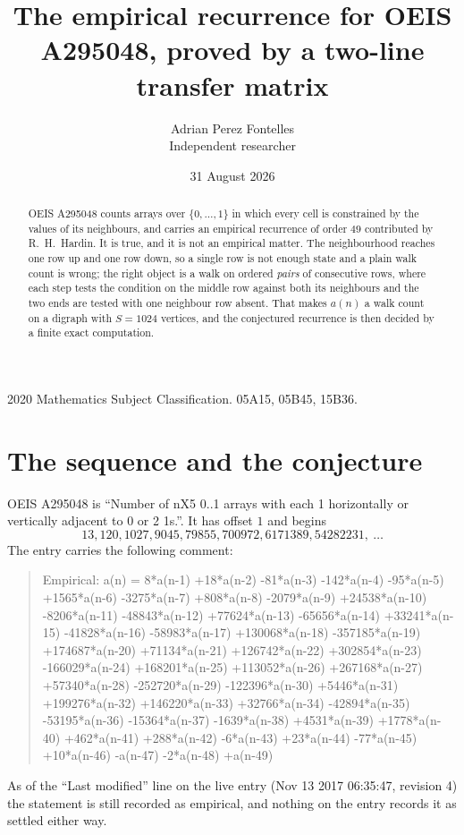 \documentclass[11pt,a4paper]{article}
\title{The empirical recurrence for OEIS A295048, proved by a two-line transfer matrix}
\author{Adrian Perez Fontelles\\ \small Independent researcher}
\date{31 August 2026}
\theoremstyle{plain}
\theoremstyle{definition}
\begin{document}
\maketitle

\begin{abstract}
OEIS A295048 counts arrays over $\{0,\dots,1\}$ in which every cell is constrained by the
values of its neighbours, and carries an empirical recurrence of order $49$ contributed
by R.~H.~Hardin. It is true, and it is not an empirical matter. The neighbourhood reaches one
row up and one row down, so a single row is not enough state and a plain walk count
is wrong; the right object is a walk on ordered \emph{pairs} of consecutive rows, where
each step tests the condition on the middle row against both its neighbours and the two
ends are tested with one neighbour row absent. That makes $a(n)$ a walk count on a digraph
with $S=1024$ vertices, and the conjectured recurrence is then decided by a finite exact
computation.
\end{abstract}

\noindent\small 2020 Mathematics Subject Classification. 05A15, 05B45, 15B36.\normalsize

\section{The sequence and the conjecture}

OEIS A295048 is ``Number of nX5 0..1 arrays with each 1 horizontally or vertically adjacent to 0 or 2 1s.''. It has offset $1$ and begins
\[
13, 120, 1027, 9045, 79855, 700972, 6171389, 54282231,\ \dots
\]
The entry carries the following comment:
\begin{quote}\small
Empirical: a(n) = 8*a(n-1) +18*a(n-2) -81*a(n-3) -142*a(n-4) -95*a(n-5) +1565*a(n-6) -3275*a(n-7) +808*a(n-8) -2079*a(n-9) +24538*a(n-10) -8206*a(n-11) -48843*a(n-12) +77624*a(n-13) -65656*a(n-14) +33241*a(n-15) -41828*a(n-16) -58983*a(n-17) +130068*a(n-18) -357185*a(n-19) +174687*a(n-20) +71134*a(n-21) +126742*a(n-22) +302854*a(n-23) -166029*a(n-24) +168201*a(n-25) +113052*a(n-26) +267168*a(n-27) +57340*a(n-28) -252720*a(n-29) -122396*a(n-30) +5446*a(n-31) +199276*a(n-32) +146220*a(n-33) +32766*a(n-34) -42894*a(n-35) -53195*a(n-36) -15364*a(n-37) -1639*a(n-38) +4531*a(n-39) +1778*a(n-40) +462*a(n-41) +288*a(n-42) -6*a(n-43) +23*a(n-44) -77*a(n-45) +10*a(n-46) -a(n-47) -2*a(n-48) +a(n-49)
\end{quote}
As of the ``Last modified'' line on the live entry (Nov 13 2017 06:35:47, revision 4) the statement is
still recorded as empirical, and nothing on the entry records it as settled either way.
\end{document}
